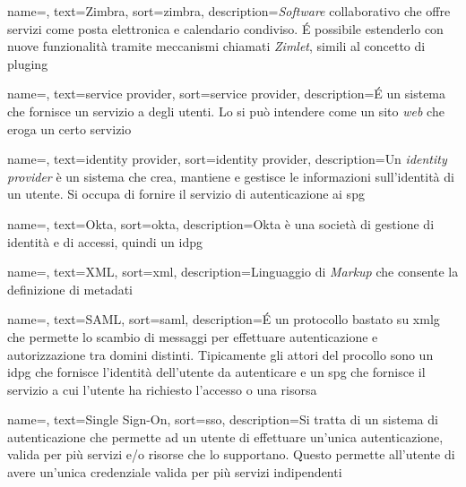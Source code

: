 
{
    name=,
    text=Zimbra,
    sort=zimbra,
    description={\textit{Software} collaborativo che offre servizi come posta elettronica e calendario condiviso. \'E possibile estenderlo con nuove funzionalità tramite meccanismi chiamati \textit{Zimlet}, simili al concetto di \gls{pluging}}
}

{
    name=,
    text=service provider,
    sort=service provider,
    description={\'E un sistema che fornisce un servizio a degli utenti. Lo si può intendere come un sito \textit{web} che eroga un certo servizio}
}

{
    name=,
    text=identity provider,
    sort=identity provider,
    description={Un \textit{identity provider} è un sistema che crea, mantiene e gestisce le informazioni sull'identità di un utente. Si occupa di fornire il servizio di autenticazione ai \gls{spg}}
}

{
    name=,
    text=Okta,
    sort=okta,
    description={Okta è una società di gestione di identità e di accessi, quindi un \gls{idpg}}
}

{
    name=,
    text=XML,
    sort=xml,
    description={Linguaggio di \textit{Markup} che consente la definizione di metadati}
}

{
    name=,
    text=SAML,
    sort=saml,
    description={\'E un protocollo bastato su \gls{xmlg} che permette lo scambio di messaggi per effettuare autenticazione e autorizzazione tra domini distinti. Tipicamente gli attori del procollo sono un \gls{idpg} che fornisce l'identità dell'utente da autenticare e un \gls{spg} che fornisce il servizio a cui l'utente ha richiesto l'accesso o una risorsa}
}

{
    name=,
    text=Single Sign-On,
    sort=sso,
    description={Si tratta di un sistema di autenticazione che permette ad un utente di effettuare un'unica autenticazione, valida per più servizi e/o risorse che lo supportano. Questo permette all'utente di avere un'unica credenziale valida per più servizi indipendenti}
}

